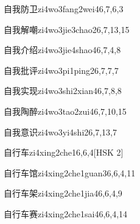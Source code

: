 \begin{entry}{自我防卫}{zi4wo3fang2wei4}{6,7,6,3}
\end{entry}

\begin{entry}{自我解嘲}{zi4wo3jie3chao2}{6,7,13,15}
\end{entry}

\begin{entry}{自我介绍}{zi4wo3jie4shao4}{6,7,4,8}
\end{entry}

\begin{entry}{自我批评}{zi4wo3pi1ping2}{6,7,7,7}
\end{entry}

\begin{entry}{自我实现}{zi4wo3shi2xian4}{6,7,8,8}
\end{entry}

\begin{entry}{自我陶醉}{zi4wo3tao2zui4}{6,7,10,15}
\end{entry}

\begin{entry}{自我意识}{zi4wo3yi4shi2}{6,7,13,7}
\end{entry}

\begin{entry}{自行车}{zi4xing2che1}{6,6,4}[HSK 2]
\end{entry}

\begin{entry}{自行车馆}{zi4xing2che1guan3}{6,6,4,11}
\end{entry}

\begin{entry}{自行车架}{zi4xing2che1jia4}{6,6,4,9}
\end{entry}

\begin{entry}{自行车赛}{zi4xing2che1sai4}{6,6,4,14}
\end{entry}

